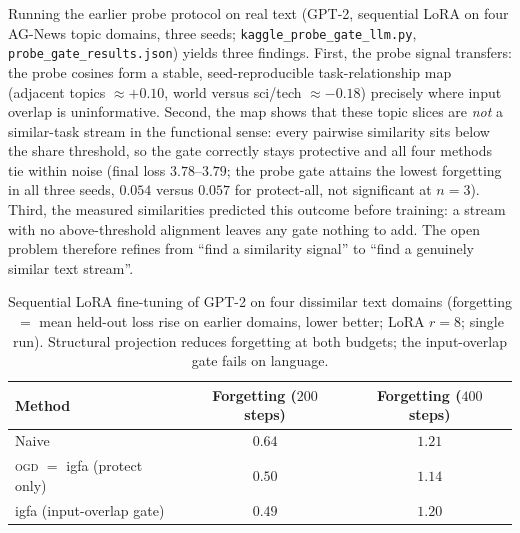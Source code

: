 \documentclass[10pt,a4paper]{article}
\theoremstyle{plain}
\theoremstyle{definition}
\newcommand{\IGFA}{igfa}
\newcommand{\OGD}{\textsc{ogd}}
\begin{document}
Running the earlier probe protocol on real text (GPT-2, sequential LoRA on four AG-News
topic domains, three seeds; \texttt{kaggle\_probe\_gate\_llm.py},
\texttt{probe\_gate\_results.json}) yields three findings. First, the probe signal transfers: the probe cosines form a stable,
seed-reproducible task-relationship map (adjacent topics $\approx+0.10$, world versus
sci/tech $\approx-0.18$) precisely where input overlap is uninformative. Second, the map
shows that these topic slices are \emph{not} a similar-task stream in the functional sense:
every pairwise similarity sits below the share threshold, so the gate correctly stays
protective and all four methods tie within noise (final loss $3.78$--$3.79$; the probe gate
attains the lowest forgetting in all three seeds, $0.054$ versus $0.057$ for protect-all,
not significant at $n=3$). Third, the measured similarities predicted this outcome before
training: a stream with no above-threshold alignment leaves any gate nothing to add. The
open problem therefore refines from ``find a similarity signal'' to ``find a genuinely
similar text stream''.

\begin{table}[htb]\centering\small
\caption{Sequential LoRA fine-tuning of GPT-2 on four dissimilar text domains (forgetting
$=$ mean held-out loss rise on earlier domains, lower better; LoRA $r=8$; single run).
Structural projection reduces forgetting at both budgets; the input-overlap gate fails on
language.}
\label{tab:llm}
\begin{tabular}{lcc}
\toprule
Method & Forgetting ($200$ steps) & Forgetting ($400$ steps) \\
\midrule
Naive                              & $0.64$ & $1.21$ \\
\OGD{} $=$ \IGFA{} (protect only)  & $\mathbf{0.50}$ & $\mathbf{1.14}$ \\
\IGFA{} (input-overlap gate)       & $0.49$ & $1.20$ \\
\bottomrule
\end{tabular}
\end{table}
\end{document}
